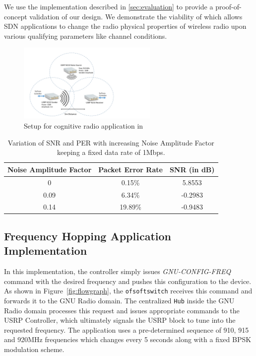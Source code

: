 We use the \crossflow implementation described in \ref{sec:evaluation} to provide a proof-of-concept validation of our design. We demonstrate the viability of \crossflow which  allows SDN applications to change the radio physical properties of wireless radio upon various qualifying parameters like channel conditions. 

\begin{figure}[t]
  \centering
  \includegraphics[width=0.6\textwidth]{figures/Setup.pdf}
  \caption{Setup for cognitive radio application in \crossflow}
  \label{fig:setup}
\end{figure}


\begin{table}[]
\centering
\caption{Variation of SNR and PER with increasing Noise Amplitude Factor keeping a fixed data rate of 1Mbps.}
\label{my-label}
\begin{tabular}{@{}|c|c|c|@{}}
\toprule
Noise Amplitude Factor & Packet Error Rate & SNR (in dB) \\ \midrule
0                      & 0.15\%            & 5.8553                     \\ \midrule
0.09                   & 6.34\%            & -0.2983                    \\ \midrule
0.14                   & 19.89\%           & -0.9483                    \\ \bottomrule
\end{tabular}
 \label{fig:table}
\end{table}

\subsection{Frequency Hopping Application Implementation}

In this implementation,  the controller simply issues \emph{GNU-CONFIG-FREQ} command with the desired frequency and pushes this configuration to the device. As shown in Figure~\ref{fig:flowgraph}, the \texttt{ofsoftswitch} receives this command and forwards it to the GNU Radio domain. The centralized \texttt{\crossflow Hub} inside the GNU Radio domain processes this request and issues appropriate commands to the  USRP Controller, which ultimately signals the USRP block to tune into the requested frequency. The application uses a pre-determined sequence of 910, 915 and 920MHz frequencies which changes every 5 seconds along with a fixed BPSK modulation scheme.


